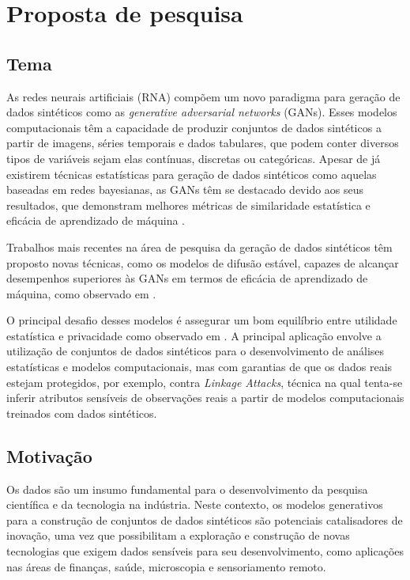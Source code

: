 \chapter{Proposta de pesquisa}
\label{capitulo:proposta}

\section{Tema}

As redes neurais artificiais (RNA) compõem um novo paradigma para geração de dados sintéticos como as \textit{generative adversarial networks} (GANs). Esses modelos computacionais têm a capacidade de produzir conjuntos de dados sintéticos a partir de imagens, séries temporais e dados tabulares, que podem conter diversos tipos de variáveis sejam elas contínuas, discretas ou categóricas. Apesar de já existirem técnicas estatísticas para geração de dados sintéticos como aquelas baseadas em redes bayesianas, as GANs têm se destacado devido aos seus resultados, que demonstram melhores métricas de similaridade estatística e eficácia de aprendizado de máquina \cite{xu2019}.

Trabalhos mais recentes na área de pesquisa da geração de dados sintéticos têm proposto novas técnicas, como os modelos de difusão estável, capazes de alcançar desempenhos superiores às GANs em termos de eficácia de aprendizado de máquina, como observado em .

O principal desafio desses modelos é assegurar um bom equilíbrio entre utilidade estatística e privacidade como observado em . A principal aplicação envolve a utilização de conjuntos de dados sintéticos para o desenvolvimento de análises estatísticas e modelos computacionais, mas com garantias de que os dados reais estejam protegidos, por exemplo, contra \textit{Linkage Attacks}, técnica na qual tenta-se inferir atributos sensíveis de observações reais a partir de modelos computacionais treinados com dados sintéticos.

\section{Motivação}

Os dados são um insumo fundamental para o desenvolvimento da pesquisa científica e da tecnologia na indústria. Neste contexto, os modelos generativos para a construção de conjuntos de dados sintéticos são potenciais catalisadores de inovação, uma vez que possibilitam a exploração e construção de novas tecnologias que exigem dados sensíveis para seu desenvolvimento, como aplicações nas áreas de finanças, saúde, microscopia e sensoriamento remoto\cite{review2022}.

